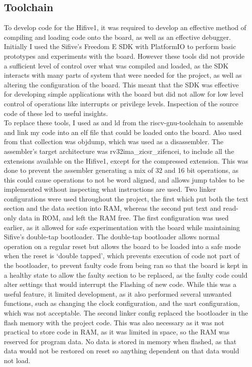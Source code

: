 \subsection{Toolchain}
To develop code for the Hifive1, it was required to develop an effective method of compiling and loading code onto the board, as well as an effective debugger. Initially I used the Sifive's Freedom E SDK with PlatformIO to perform basic prototypes and experiments with the board. However these tools did not provide a sufficient level of control over what was compiled and loaded, as the SDK interacts with many parts of system that were needed for the project, as well as altering the configuration of the board. This meant that the SDK was effective for developing simple applications with the board but did not allow for low level control of operations like interrupts or privilege levels. Inspection of the source code of these led to useful insights.\\
To replace these tools, I used as and ld from the riscv-gnu-toolchain to assemble and link my code into an elf file that could be loaded onto the board. Also used from that collection was objdump, which was used as a disassembler. The assembler's target architecture was rv32ima\_zicsr\_zifencei, to include all the extensions available on the Hifive1, except for the compressed extension. This was done to prevent the assembler generating a mix of 32 and 16 bit operations, as this could cause operations to not be word aligned, and allows jump tables to be implemented without inspecting what instructions are used. Two linker configurations were used throughout the project, the first which put both the text section and the data section into RAM, whereas the second put text and read-only data in ROM, and left the RAM free. The first configuration was used earlier, as it allowed for safe experimentation with the board while maintaining Sifive's double-tap bootloader. The double-tap bootloader allows normal operation on a regular reset but allows the board to be loaded into a safe mode when the reset is `double tapped', which prevents execution of code not part of the bootloader, to prevent faulty code from being ran so that the board is kept in a healthy state to allow the faulty section to be replaced, as the faulty code could alter settings that would interrupt the Flashing of new code. While this was a useful feature, it limited development, as it also performed several unwanted functions, such as changing the clock configuration, and the uart configuration, which was not acceptable. The second linker config replaced the bootloader in the flash memory with the project code. This was also necessary as it was not practical to store code in RAM, as it was limited in space, so the RAM was reserved for program data. No data is stored in memory when flashed, as that data would not be restored on reset so anything dependent on that data would not load.\\
